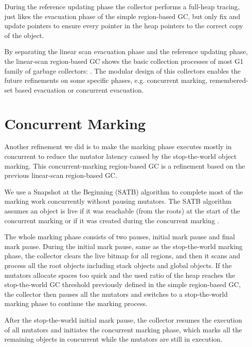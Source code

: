During the reference updating phase the collector performs a full-heap tracing,
just likes the evacuation phase of the simple region-based GC, but only fix and update
pointers to ensure every pointer in the heap pointers to the correct copy of the object.

By separating the linear scan evacuation phase and the reference updating phase,
the linear-scan region-based GC shows the basic collection processes of most G1 family
of garbage collectors: .
The modular design of this collectors enables the future refinements on some specific
phases, e.g. concurrent marking, remembered-set based evacuation or concurrent evacuation.

\section{Concurrent Marking}
\label{sec:concmarkgc}

Another refinement we did is to make the marking phase executes mostly in concurrent to reduce the
mutator latency caused by the stop-the-world object marking.
This concurrent-marking region-based GC is a refinement based on the previous linear-scan region-based GC.

We use a Snapshot at the Beginning (SATB) algorithm \cite{yuasa1990real} to
complete most of the marking work concurrently without pausing mutators. The SATB algorithm assumes an object is live if it was reachable (from the roots)
at the start of the concurrent marking or if it was created during the concurrent marking \cite{yuasa1990real}.

The whole marking phase consists of two pauses, initial mark pause and final mark pause.
During the initial mark pause, same as the stop-the-world marking phase,
the collector clears the live bitmap for all regions,
and then it scans and process all the root objects including stack objects and global objects.
If the mutators allocate spaces too quick and the used ratio of the heap reaches
the stop-the-world GC threshold previously defined in the simple region-based GC, the
collector then pauses all the mutators and switches to a stop-the-world marking phase
to continue the marking process.

After the stop-the-world initial mark pause, the collector resumes the execution of all mutators and
initiates the concurrent marking phase, which marks all the remaining objects in concurrent
while the mutators are still in execution.

